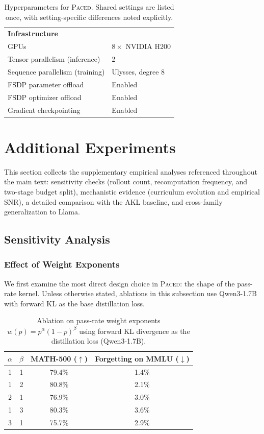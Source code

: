 \documentclass{article}
\newcommand{\mstd}[2]{#1\if\relax\detokenize{#2}\relax\else{$\scriptstyle\,\pm\,#2$}\fi\%}
\begin{document}
\begin{table}[ht]
\begin{tabular}{ll}
  \textbf{Infrastructure} & \\
  GPUs & $8 \times$ NVIDIA H200 \\
  Tensor parallelism (inference) & 2 \\
  Sequence parallelism (training) & Ulysses, degree 8 \\
  FSDP parameter offload & Enabled \\
  FSDP optimizer offload & Enabled \\
  Gradient checkpointing & Enabled \\
  \bottomrule
\end{tabular}
\caption{Hyperparameters for \textsc{Paced}. Shared settings are listed once, with setting-specific differences noted explicitly.}
\label{tab:hyperparameters}
\end{table}
\clearpage

\section{Additional Experiments}
\label{app:additional_experiments}

This section collects the supplementary empirical analyses referenced throughout the main text: sensitivity checks (rollout count, recomputation frequency, and two-stage budget split), mechanistic evidence (curriculum evolution and empirical SNR), a detailed comparison with the AKL baseline, and cross-family generalization to Llama.

\subsection{Sensitivity Analysis}
\subsubsection{Effect of Weight Exponents}
\label{app:ablation_exponents}

We first examine the most direct design choice in \textsc{Paced}: the shape of the pass-rate kernel. Unless otherwise stated, ablations in this subsection use Qwen3-1.7B with forward KL as the base distillation loss.

\begin{table}[h]
\caption{Ablation on pass-rate weight exponents $w(p)=p^\alpha(1-p)^\beta$ using forward KL divergence as the distillation loss (Qwen3-1.7B).}
\centering
\begin{tabular}{cc|cc}
\toprule
$\alpha$ & $\beta$ & MATH-500 ($\uparrow$) & Forgetting on MMLU ($\downarrow$) \\
\midrule
1 & 1 & \mstd{79.4}{} & 1.4\% \\
1 & 2 & \mstd{80.8}{} & 2.1\% \\
2 & 1 & \mstd{76.9}{} & 3.0\% \\
1 & 3 & \mstd{80.3}{} & 3.6\% \\
3 & 1 & \mstd{75.7}{} & 2.9\% \\
\bottomrule
\end{tabular}
\label{tab:ablation_exponents}
\end{table}
\end{document}
